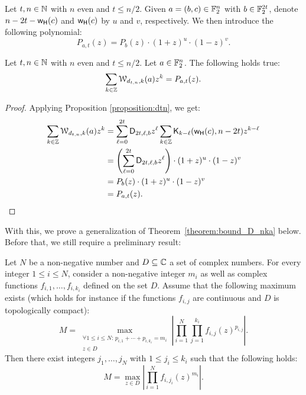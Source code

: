 \documentclass[11pt]{llncs}
\begin{document}
\begin{definition}\label{defi:P_a_t}
    Let $t, n\in \mathbb{N}$ with $n$ even and $t\le n/2$. Given $a=(b,c)\in\mathbb{F}_2^n$ with $b\in\mathbb{F}_2^{2t}$, denote $n-2t-\mathsf{w_H}(c)$ and $\mathsf{w_H}(c)$ by $u$ and $v$, respectively. We  then introduce the following polynomial:
    \[
        P_{a,t}(z)=P_b(z)\cdot(1+z)^u\cdot(1-z)^v.
    \]
\end{definition}

\begin{proposition}
    Let $t, n\in \mathbb{N}$ with $n$ even and $t\le n/2$. Let $a\in\mathbb{F}_2^n$. The following holds true: 
    \[
        \sum_{k\in\mathbb{Z}}\mathcal{W}_{d_{t,n},k}(a)z^k=P_{a,t}(z).
    \]
\end{proposition}

\begin{proof}
    Applying Proposition \ref{proposition:dtn}, we get:
    \begin{align*}
        \sum_{k\in\mathbb{Z}}\mathcal{W}_{d_{t,n},k}(a)z^k&=\sum_{\ell=0}^{2t}\mathsf{D}_{2t,\ell,b}z^\ell\sum_{k\in\mathbb{Z}}\mathsf{K}_{k-\ell}(\mathsf{w_H}(c),n-2t)z^{k-\ell}\\
        &=\left(\sum_{\ell=0}^{2t}\mathsf{D}_{2t,\ell,b}z^\ell\right)\cdot(1+z)^u\cdot(1-z)^v\\
        &=P_b(z)\cdot(1+z)^u\cdot(1-z)^v\\
        &=P_{a,t}(z).\qedhere
    \end{align*}
\end{proof}

With this, we prove a generalization of Theorem~\ref{theorem:bound_D_nka} below. Before that, we still require a preliminary result:

\begin{lemma}\label{lemma:maximizing_args}
    Let $N$ be a non-negative number and $D\subseteq\mathbb{C}$ a set of complex numbers. For every integer $1\leq i\leq N$, consider a non-negative integer $m_i$ as well as complex functions $f_{i,1},\dots,f_{i,k_i}$ defined on the set $D$. Assume that the following maximum exists (which holds for instance if the functions $f_{i,j}$ are continuous and $D$ is topologically compact):
    \[
        M=\max_{\substack{\forall 1\leq i\leq N:\,p_{i,1}+\cdots+p_{i,k_i}=m_i\\z\in D}}\left|\prod_{i=1}^N\prod_{j=1}^{k_i}f_{i,j}(z)^{p_{i,j}}\right|.
    \]
    Then there exist integers $j_1,\dots,j_N$ with $1\leq j_i\leq k_i$ such that the following holds:
    \[
        M=\max_{z\in D}\left|\prod_{i=1}^Nf_{i,j_i}(z)^{m_i}\right|.
    \]
\end{lemma}
\end{document}
